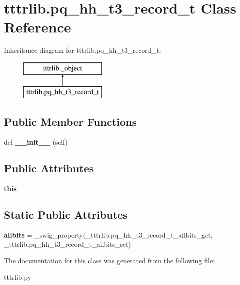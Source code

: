 \hypertarget{classtttrlib_1_1pq__hh__t3__record__t}{}\section{tttrlib.\+pq\+\_\+hh\+\_\+t3\+\_\+record\+\_\+t Class Reference}
\label{classtttrlib_1_1pq__hh__t3__record__t}
Inheritance diagram for tttrlib.\+pq\+\_\+hh\+\_\+t3\+\_\+record\+\_\+t\+:\begin{figure}[H]
\begin{center}
\leavevmode
\includegraphics[height=2.000000cm]{classtttrlib_1_1pq__hh__t3__record__t}
\end{center}
\end{figure}
\subsection*{Public Member Functions}
\begin{DoxyCompactItemize}
\item 
\mbox{\label{classtttrlib_1_1pq__hh__t3__record__t_a40a23dea953bc6cf0f366349b05bbfd4}} 
def {\bfseries \+\_\+\+\_\+init\+\_\+\+\_\+} (self)
\end{DoxyCompactItemize}
\subsection*{Public Attributes}
\begin{DoxyCompactItemize}
\item 
\mbox{\label{classtttrlib_1_1pq__hh__t3__record__t_a912b9a3cd041ac1e27492accc31c5eaf}} 
{\bfseries this}
\end{DoxyCompactItemize}
\subsection*{Static Public Attributes}
\begin{DoxyCompactItemize}
\item 
\mbox{\label{classtttrlib_1_1pq__hh__t3__record__t_af571bc699dab467e1b46f11557671b4d}} 
{\bfseries allbits} = \+\_\+swig\+\_\+property(\+\_\+tttrlib.\+pq\+\_\+hh\+\_\+t3\+\_\+record\+\_\+t\+\_\+allbits\+\_\+get, \+\_\+tttrlib.\+pq\+\_\+hh\+\_\+t3\+\_\+record\+\_\+t\+\_\+allbits\+\_\+set)
\end{DoxyCompactItemize}


The documentation for this class was generated from the following file\+:\begin{DoxyCompactItemize}
\item 
tttrlib.\+py\end{DoxyCompactItemize}

